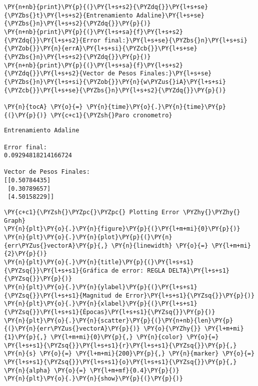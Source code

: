 \begin{tcolorbox}[breakable, size=fbox, boxrule=1pt, pad at break*=1mm,colback=cellbackground, colframe=cellborder]
\begin{Verbatim}[commandchars=\\\{\}]
\PY{n+nb}{print}\PY{p}{(}\PY{l+s+s2}{\PYZdq{}}\PY{l+s+se}{\PYZbs{}t}\PY{l+s+s2}{Entrenamiento Adaline}\PY{l+s+se}{\PYZbs{}n}\PY{l+s+s2}{\PYZdq{}}\PY{p}{)}
\PY{n+nb}{print}\PY{p}{(}\PY{l+s+sa}{f}\PY{l+s+s2}{\PYZdq{}}\PY{l+s+s2}{Error final:}\PY{l+s+se}{\PYZbs{}n}\PY{l+s+si}{\PYZob{}}\PY{n}{errA}\PY{l+s+si}{\PYZcb{}}\PY{l+s+se}{\PYZbs{}n}\PY{l+s+s2}{\PYZdq{}}\PY{p}{)}
\PY{n+nb}{print}\PY{p}{(}\PY{l+s+sa}{f}\PY{l+s+s2}{\PYZdq{}}\PY{l+s+s2}{Vector de Pesos Finales:}\PY{l+s+se}{\PYZbs{}n}\PY{l+s+si}{\PYZob{}}\PY{n}{w\PYZus{}iA}\PY{l+s+si}{\PYZcb{}}\PY{l+s+se}{\PYZbs{}n}\PY{l+s+s2}{\PYZdq{}}\PY{p}{)}

\PY{n}{tocA} \PY{o}{=} \PY{n}{time}\PY{o}{.}\PY{n}{time}\PY{p}{(}\PY{p}{)} \PY{c+c1}{\PYZsh{}Paro cronometro}
\end{Verbatim}
\end{tcolorbox}

    \begin{Verbatim}[commandchars=\\\{\}]
        Entrenamiento Adaline

Error final:
0.09294818214166724

Vector de Pesos Finales:
[[0.50784435]
 [0.30789657]
 [4.50158229]]

    \end{Verbatim}

    \begin{tcolorbox}[breakable, size=fbox, boxrule=1pt, pad at break*=1mm,colback=cellbackground, colframe=cellborder]
\begin{Verbatim}[commandchars=\\\{\}]
\PY{c+c1}{\PYZsh{}\PYZpc{}\PYZpc{} Plotting Error \PYZhy{}\PYZhy{} Graph}
\PY{n}{plt}\PY{o}{.}\PY{n}{figure}\PY{p}{(}\PY{l+m+mi}{0}\PY{p}{)}
\PY{n}{plt}\PY{o}{.}\PY{n}{plot}\PY{p}{(}\PY{n}{err\PYZus{}vectorA}\PY{p}{,} \PY{n}{linewidth} \PY{o}{=} \PY{l+m+mi}{2}\PY{p}{)}
\PY{n}{plt}\PY{o}{.}\PY{n}{title}\PY{p}{(}\PY{l+s+s1}{\PYZsq{}}\PY{l+s+s1}{Gráfica de error: REGLA DELTA}\PY{l+s+s1}{\PYZsq{}}\PY{p}{)}
\PY{n}{plt}\PY{o}{.}\PY{n}{ylabel}\PY{p}{(}\PY{l+s+s1}{\PYZsq{}}\PY{l+s+s1}{Magnitud de Error}\PY{l+s+s1}{\PYZsq{}}\PY{p}{)}
\PY{n}{plt}\PY{o}{.}\PY{n}{xlabel}\PY{p}{(}\PY{l+s+s1}{\PYZsq{}}\PY{l+s+s1}{Épocas}\PY{l+s+s1}{\PYZsq{}}\PY{p}{)}
\PY{n}{plt}\PY{o}{.}\PY{n}{scatter}\PY{p}{(}\PY{n+nb}{len}\PY{p}{(}\PY{n}{err\PYZus{}vectorA}\PY{p}{)} \PY{o}{\PYZhy{}} \PY{l+m+mi}{1}\PY{p}{,} \PY{l+m+mi}{0}\PY{p}{,} \PY{n}{color} \PY{o}{=} \PY{l+s+s1}{\PYZsq{}}\PY{l+s+s1}{r}\PY{l+s+s1}{\PYZsq{}}\PY{p}{,} \PY{n}{s} \PY{o}{=} \PY{l+m+mi}{200}\PY{p}{,} \PY{n}{marker} \PY{o}{=} \PY{l+s+s1}{\PYZsq{}}\PY{l+s+s1}{o}\PY{l+s+s1}{\PYZsq{}}\PY{p}{,} \PY{n}{alpha} \PY{o}{=} \PY{l+m+mf}{0.4}\PY{p}{)}
\PY{n}{plt}\PY{o}{.}\PY{n}{show}\PY{p}{(}\PY{p}{)}
\end{Verbatim}
\end{tcolorbox}

